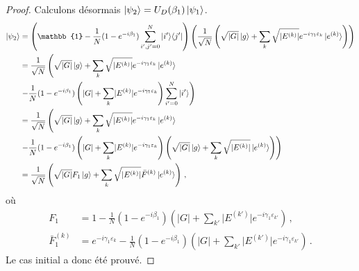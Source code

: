 \begin{proof}
\noindent
Calculons désormais $\ket{\psi_{2}} = U_{D} (\beta_{1})\ket{\psi_{1}}$.
\begin{equation}
\begin{aligned}
    \ket{\psi_{2}} &= \left( \mathbb{1} - \frac{1}{N} (1 - e^{-i\beta_{1}}) \sum_{i',j'=0}^{N} \ket{i'}\!\bra{j'} \right) \left( \frac{1}{ \sqrt{ N }} \left( \sqrt{ \lvert G \rvert  } \ket{g} + \sum_{k} \sqrt{ \lvert E^{(k)} \rvert  } e^{-i \gamma_{1} \varepsilon_{k}}  \ket{e^{(k)}} \right) \right) \\
    &=  \frac{1}{ \sqrt{ N }} \left( \sqrt{ \lvert G \rvert  } \ket{g} + \sum_{k} \sqrt{ \lvert E^{(k)} \rvert  } e^{-i \gamma_{1} \varepsilon_{k}}  \ket{e^{(k)}} \right. \\
    &\left. - \frac{1}{N} (1 - e^{-i\beta_{1}}) \left( \lvert G \rvert + \sum_{k} \lvert E^{(k)} \rvert e^{-i \gamma_{1} \varepsilon_{k}} \right) \sum_{i'=0}^{N} \ket{i'} \right) \\
    &=  \frac{1}{ \sqrt{ N }} \left( \sqrt{ \lvert G \rvert  } \ket{g} + \sum_{k} \sqrt{ \lvert E^{(k)} \rvert  } e^{-i \gamma_{1} \varepsilon_{k}}  \ket{e^{(k)}} \right. \\
    & \left. - \frac{1}{N} (1 - e^{-i\beta_{1}}) \left( \lvert G \rvert + \sum_{k} \lvert E^{(k)} \rvert e^{-i \gamma_{1} \varepsilon_{k}}   \right) \left( \sqrt{ \lvert G \rvert  } \ket{g} + \sum_{k} \sqrt{ \lvert E^{(k)} \rvert } \ket{e^{(k)}} \right) \right) \\
    &= \frac{1}{\sqrt{ N }} \left( \sqrt{ \lvert G \rvert } F_{1} \ket{g} + \sum_{k} \sqrt{ \lvert E^{(k)} \rvert } \bar{F}^{(k)} \ket{e^{(k)}} \right) \,,
\end{aligned}
\end{equation}
où 
\begin{align}
    F_{1} &= 1 - \frac{1}{N} (1 - e^{-i\beta_{1}}) \left(  \lvert G \rvert + \sum_{k'} \lvert E^{(k')} \rvert e^{-i \gamma_{1} \varepsilon_{k'}} \right) \,, \\
    \bar{F}^{(k)}_{1} &= e^{-i\gamma_{1} \varepsilon_{k}} - \frac{1}{N} (1 - e^{-i\beta_{1}}) \left(  \lvert G \rvert + \sum_{k'} \lvert E^{(k')} \rvert e^{-i \gamma_{1} \varepsilon_{k'}} \right) \,.
\end{align}
Le cas initial a donc été prouvé.


\end{proof}
